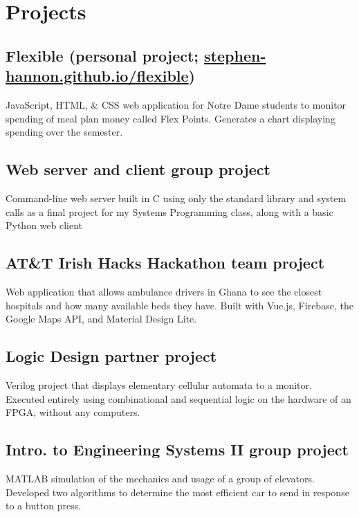 \documentclass[letterpaper]{article}
\begin{document}
\begin{minipage}[t]{\dimexpr.67\textwidth-.5\columnsep}
\section{Projects}

\subsection{Flexible (personal project; \href{https://stephen-hannon.github.io/flexible/}{stephen-hannon.github.io/flexible})}
JavaScript, HTML, \& CSS web application for Notre Dame students to monitor spending of meal plan money called Flex Points. Generates a chart displaying spending over the semester.

\subsection{Web server and client group project}
Command-line web server built in C using only the standard library and system calls as a final project for my Systems Programming class, along with a basic Python web client

\subsection{AT\&T Irish Hacks Hackathon team project}
Web application that allows ambulance drivers in Ghana to see the closest hospitals and how many available beds they have. Built with Vue.js, Firebase, the Google Maps API, and Material Design Lite.

\subsection{Logic Design partner project}
Verilog project that displays elementary cellular automata to a monitor. Executed entirely using combinational and sequential logic on the hardware of an FPGA, without any computers.

\subsection{Intro. to Engineering Systems II group project}
MATLAB simulation of the mechanics and usage of a group of elevators. Developed two algorithms to determine the most efficient car to send in response to a button press.

\end{minipage}
\end{document}
